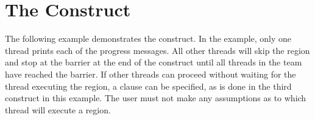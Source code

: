\pagebreak
\section{The  Construct}
\label{sec:single}

The following example demonstrates the  construct. In the example, 
only one thread prints each of the progress messages. All other threads will skip 
the  region and stop at the barrier at the end of the  
construct until all threads in the team have reached the barrier. If other threads 
can proceed without waiting for the thread executing the  region, 
a  clause can be specified, as is done in the third  
construct in this example. The user must not make any assumptions as to which thread 
will execute a  region.




